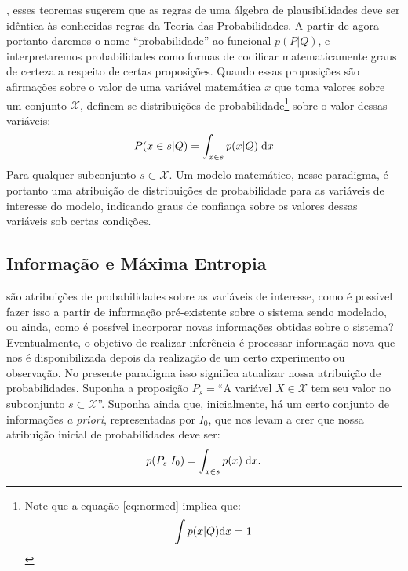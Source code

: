 , esses teoremas sugerem que as regras de uma álgebra de plausibilidades deve ser idêntica às conhecidas regras da Teoria das Probabilidades. A partir de agora portanto daremos o nome ``probabilidade'' ao funcional $p(P|Q)$, e interpretaremos probabilidades como formas de codificar matematicamente graus de certeza a respeito de certas proposições. Quando essas proposições são afirmações sobre o valor de uma variável matemática $x$ que toma valores sobre um conjunto $\mathcal{X}$, definem-se distribuições de probabilidade\footnote{Note que a equação \eqref{eq:normed} implica que: \[\int p(x|Q)\mathrm{d} x  = 1\]} sobre o valor dessas variáveis:
\begin{equation}
 P(x \in s| Q) = \int_{x \in s} p(x | Q)\;\mathrm{d} x
\end{equation}
Para qualquer subconjunto $s \subset \mathcal{X}$. Um modelo matemático, nesse paradigma, é portanto uma atribuição de distribuições de probabilidade para as variáveis de interesse do modelo, indicando graus de confiança sobre os valores dessas variáveis sob certas condições. 

\subsection{Informação e Máxima Entropia}
 são atribuições de probabilidades sobre as variáveis de interesse, como é possível fazer isso a partir de informação pré-existente sobre o sistema sendo modelado, ou ainda, como é possível incorporar novas informações obtidas sobre o sistema? Eventualmente, o objetivo de realizar inferência é processar informação nova que nos é disponibilizada depois da realização de um certo experimento ou observação. No presente paradigma isso significa atualizar nossa atribuição de probabilidades. Suponha a proposição $P_{s} =$``A variável $X\in \mathcal{X}$ tem seu valor no subconjunto $s\subset\mathcal{X}$''. Suponha ainda que, inicialmente, há um certo conjunto de informações \emph{a priori}, representadas por $I_{0}$, que nos levam a crer que nossa atribuição inicial de probabilidades deve ser:
\[
 p(P_{s} | I_{0} ) = \int_{x\in s} p(x)\;\mathrm{d} x.
\]

